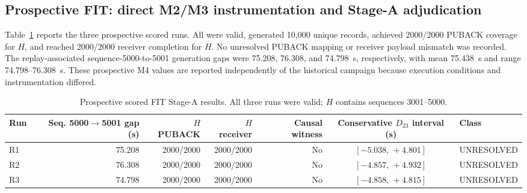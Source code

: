 \documentclass[journal]{IEEEtran}
\begin{document}
\subsection{Prospective FIT: direct M2/M3 instrumentation and Stage-A adjudication}

Table~\ref{tab:stagea} reports the three prospective scored runs. All were valid, generated 10,000 unique records, achieved 2000/2000 PUBACK coverage for $H$, and reached 2000/2000 receiver completion for $H$. No unresolved PUBACK mapping or receiver payload mismatch was recorded. The replay-associated sequence-5000-to-5001 generation gaps were 75.208, 76.308, and 74.798~s, respectively, with mean 75.438~s and range 74.798--76.308~s. These prospective M4 values are reported independently of the historical campaign because execution conditions and instrumentation differed.

\begin{table}[t]
\centering
\small
\caption{Prospective scored FIT Stage-A results. All three runs were valid; $H$ contains sequences 3001--5000.}
\label{tab:stagea}
\begin{tabular}{@{}lrrrrcl@{}}
\toprule
\textbf{Run} &
\textbf{Seq. 5000$\rightarrow$5001 gap (s)} &
\textbf{$H$ PUBACK} &
\textbf{$H$ receiver} &
\textbf{Causal witness} &
\textbf{Conservative $D_{23}$ interval (s)} &
\textbf{Class} \\
\midrule
R1 & 75.208 & 2000/2000 & 2000/2000 & No & $[-5.038,\,+4.801]$ & UNRESOLVED \\
R2 & 76.308 & 2000/2000 & 2000/2000 & No & $[-4.857,\,+4.932]$ & UNRESOLVED \\
R3 & 74.798 & 2000/2000 & 2000/2000 & No & $[-4.858,\,+4.815]$ & UNRESOLVED \\
\bottomrule
\end{tabular}
\end{table}
\end{document}
